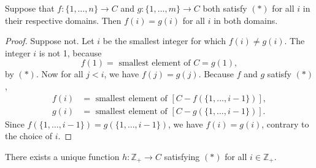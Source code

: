 \begin{lemma}
\label{lem:\thetheorem}
 Suppose that \(f : \{1,\ldots, n\} \rightarrow C\) and \(g : \{1,\ldots, m\} \rightarrow C\) both satisfy \((*)\) for all \(i\) in their respective domains. Then \(f(i) = g(i)\) for all \(i\) in both domains.
\end{lemma}

\begin{proof}
 Suppose not. Let \(i\) be the smallest integer for which \(f(i) \neq g(i)\). The integer \(i\) is not 1, because
 \[
 f(1) = \text{ smallest element of }C = g(1),
 \]
 by \((*)\). Now for all \(j < i\), we have \(f( j) = g( j)\). Because \(f\) and \(g\) satisfy \((*)\),
 \[
 \begin{aligned}
 f(i) &= \text{ smallest element of }[{C - f({\{1,\ldots, i - 1\} }) }] , \\
 g(i) &= \text{ smallest element of }[{C - g({\{1,\ldots, i - 1\} }) }] \text{.}
 \end{aligned}
 \]
 Since \(f({\{1,\ldots, i - 1\} }) = g({\{1,\ldots, i - 1\} })\), we have \(f(i) = g(i)\), contrary to the choice of \(i\).
\end{proof}

\begin{theorem}
\label{thm:\thetheorem}
 There exists a unique function \(h : \mathbb{Z}_{+} \rightarrow C\) satisfying \((*)\) for all \(i \in {\mathbb{Z}}_{+}\).
\end{theorem}

